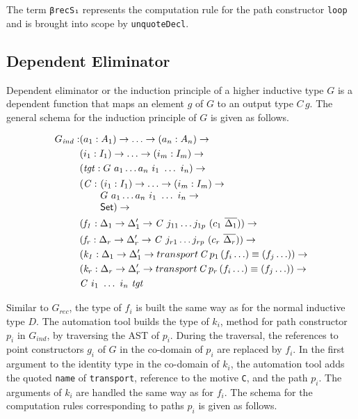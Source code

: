 \documentclass[sigplan,10pt]{acmart}
\begin{document}
The term {\tt βrecS₁} represents the computation rule for the path constructor {\tt loop} and is brought into scope by {\tt unquoteDecl}.

\subsection{Dependent Eliminator}
\label{sec:sec4.3}

Dependent eliminator or the induction principle of a higher inductive type $G$ is a dependent function that maps an element $g$ of $G$ to an output type $C \, g$. The general schema for the induction principle of $G$ is given as follows.

\begin{align*}
G_{\mathit{ind}} : & (a_1 : A_1) \to \ldots \to (a_n : A_n) \to\\
& (i_1 : I_1) \to \ldots \to (i_m : I_m) \to\\
& (\mathit{tgt} : G\ a_1 \ldots a_n\ i_1\ \ldots\ i_n) \to\\
& \begin{array}{@{}l@{}l}(\mathit{C} :\ & (i_1 : I_1) \to \ldots \to (i_m : I_m) \to\\  & G\ a_1 \ldots a_n\ i_1\ \ldots\ i_n \to\\ &\SET{})\to\end{array} \\
& (\mathit{f_1} : \Delta_1 \to  \Delta_1^\prime \to \mathit{C}\ j_{11} \ldots j_{1p}\ (c_1\ \overline{\Delta_1})) \to \\
& (\mathit{f_r} : \Delta_r \to  \Delta_r^\prime \to \mathit{C}\ j_{r1} \ldots j_{rp}\ (c_r\ \overline{\Delta_r})) \to \\
& (\mathit{k_1} : \Delta_1 \to  \Delta_1^\prime \to transport \, \mathit{C} \, p_1 \, (f_i \ldots) \equiv (f_j \ldots)) \to \\
& (\mathit{k_r} : \Delta_r \to  \Delta_r^\prime \to transport \, \mathit{C} \, p_r \, (f_i \ldots) \equiv (f_j \ldots)) \to \\
& \mathit{C}\ i_1\ \ldots\ i_n\ \mathit{tgt}
\end{align*}

Similar to $G_{rec}$, the type of $f_i$ is built the same way as for the normal inductive type $D$. The automation tool builds the type of $k_i$, method for path constructor $p_i$ in $G_{ind}$, by traversing the AST of $p_i$. During the traversal, the references to point constructors $g_i$ of $G$ in the co-domain of $p_i$ are replaced by $f_i$. In the first argument to the identity type in the co-domain of $k_i$, the automation tool adds the quoted {\tt name} of {\tt transport}, reference to the motive {\tt C}, and the path $p_i$. The arguments of $k_i$ are handled the same way as for $f_i$. The schema for the computation rules corresponding to paths $p_i$ is given as follows.
\end{document}
